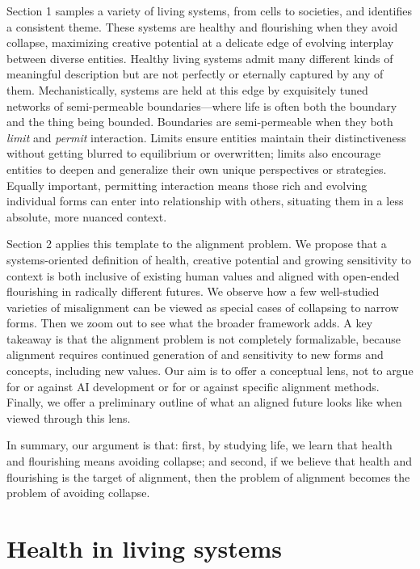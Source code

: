 \documentclass[11pt]{article}
\begin{document}
Section 1 samples a variety of living systems, from cells to societies, and identifies a consistent theme. These systems are healthy and flourishing when they avoid collapse, maximizing creative potential at a delicate edge of evolving interplay between diverse entities. Healthy living systems admit many different kinds of meaningful description but are not perfectly or eternally captured by any of them. Mechanistically, systems are held at this edge by exquisitely tuned networks of semi-permeable boundaries---where life is often both the boundary and the thing being bounded. Boundaries are semi-permeable when they both \textit{limit} and \textit{permit} interaction. Limits ensure entities maintain their distinctiveness without getting blurred to equilibrium or overwritten; limits also encourage entities to deepen and generalize their own unique perspectives or strategies. Equally important, permitting interaction means those rich and evolving individual forms can enter into relationship with others, situating them in a less absolute, more nuanced context. 

Section 2 applies this template to the alignment problem. We propose that a systems-oriented definition of health, creative potential and growing sensitivity to context is both inclusive of existing human values and aligned with open-ended flourishing in radically different futures. We observe how a few well-studied varieties of misalignment can be viewed as special cases of collapsing to narrow forms. Then we zoom out to see what the broader framework adds. A key takeaway is that the alignment problem is not completely formalizable, because alignment requires continued generation of and sensitivity to new forms and concepts, including new values. Our aim is to offer a conceptual lens, not to argue for or against AI development or for or against specific alignment methods. Finally, we offer a preliminary outline of what an aligned future looks like when viewed through this lens.  


In summary, our argument is that: first, by studying life, we learn that health and flourishing means avoiding collapse; and second, if we believe that health and flourishing is the target of alignment, then the problem of alignment becomes the problem of avoiding collapse.


\section{Health in living systems}
\end{document}
